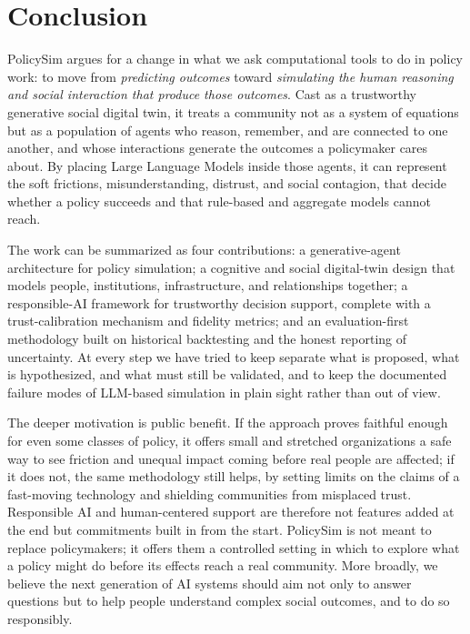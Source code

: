\documentclass[conference]{IEEEtran}
\begin{document}
\section{Conclusion}

PolicySim argues for a change in what we ask computational tools to do in policy work: to move from \emph{predicting outcomes} toward \emph{simulating the human reasoning and social interaction that produce those outcomes}. Cast as a trustworthy generative social digital twin, it treats a community not as a system of equations but as a population of agents who reason, remember, and are connected to one another, and whose interactions generate the outcomes a policymaker cares about. By placing Large Language Models inside those agents, it can represent the soft frictions, misunderstanding, distrust, and social contagion, that decide whether a policy succeeds and that rule-based and aggregate models cannot reach.

The work can be summarized as four contributions: a generative-agent architecture for policy simulation; a cognitive and social digital-twin design that models people, institutions, infrastructure, and relationships together; a responsible-AI framework for trustworthy decision support, complete with a trust-calibration mechanism and fidelity metrics; and an evaluation-first methodology built on historical backtesting and the honest reporting of uncertainty. At every step we have tried to keep separate what is proposed, what is hypothesized, and what must still be validated, and to keep the documented failure modes of LLM-based simulation in plain sight rather than out of view.

The deeper motivation is public benefit. If the approach proves faithful enough for even some classes of policy, it offers small and stretched organizations a safe way to see friction and unequal impact coming before real people are affected; if it does not, the same methodology still helps, by setting limits on the claims of a fast-moving technology and shielding communities from misplaced trust. Responsible AI and human-centered support are therefore not features added at the end but commitments built in from the start. PolicySim is not meant to replace policymakers; it offers them a controlled setting in which to explore what a policy might do before its effects reach a real community. More broadly, we believe the next generation of AI systems should aim not only to answer questions but to help people understand complex social outcomes, and to do so responsibly.
\end{document}
